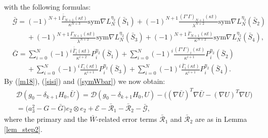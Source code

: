 \documentclass[reqno,twoside,11pt]{amsart}
\newcommand{\sym}{\mathrm{sym}}
\newcommand*{\dbar}[1]{\bar{\bar{#1}}}
\numberwithin{equation}{section}
\theoremstyle{plain}
\theoremstyle{definition}
\begin{document}
with the following formulas:
\begin{equation*}
\begin{split}
& \bar{\mathcal{G}} = (-1)^{N+1} \frac{\dbar\Gamma_{N+1}(\kappa
  t)}{\kappa^{N+3}}\sym \nabla L_N^{\eta_2}(\bar S_1)  
+ (-1)^{N+1} \frac{(\Gamma'\Gamma)_{N+1}(\kappa
  t)}{\lambda^{N+2}}\sym\nabla L_N^{\eta_2}(\bar S_2) 
\\ & \qquad + (-1)^{N+1} \frac{\Gamma_{N+1}(\kappa
  t)}{\lambda^{N+2}}\sym\nabla L_N^{\eta_2}(\bar S_3) 
+ (-1)^{N+1} \frac{\bar\Gamma_{N+1}(\kappa
  t)}{\kappa^{N+2}}\sym\nabla L_N^{\eta_2}(\bar S_4), \\
& \bar G = \sum_{i=0}^N (-1)^i \frac{\dbar\Gamma_{i}(\kappa
  t)}{\kappa^{i+2}}P_i^{\eta_2}(\bar S_1) 
+ \sum_{i=0}^N (-1)^i \frac{(\Gamma'\Gamma)_{i}(\kappa
  t)}{\kappa^{i+1}}P_i^{\eta_2}(\bar S_2) 
\\ & \qquad + \sum_{i=0}^N (-1)^i \frac{\Gamma_{i}(\kappa
  t)}{\kappa^{i+1}}P_i^{\eta_2}(\bar S_3) 
+ \sum_{i=0}^N (-1)^i \frac{\bar\Gamma_{i}(\kappa
  t)}{\kappa^{i+1}}P_i^{\eta_2}(\bar S_4). 
\end{split}
\end{equation*}
By (\ref{m18}), (\ref{sisi})  and (\ref{symWbar}) we now obtain: 
\begin{equation}\label{m12bar}
\begin{split}
& \mathcal{D}(g_0-\delta_{k+1}H_0, \bar U) = \mathcal{D}(g_0-\delta_{k+1}H_0,
U) -\big((\nabla \bar U)^T\nabla \bar U - (\nabla U)^T\nabla U\big) \\ & =
\big(a_3^2 - G-\bar G\big) e_2\otimes e_2 +\mathcal{E}
- \bar{\mathcal{R}}_1  - \bar{\mathcal{R}}_2 -\bar{\mathcal{G}},
\end{split}
\end{equation}
where the primary and the $\bar W$-related error terms
$\bar{\mathcal{R}}_1$ and $\bar{\mathcal{R}}_2$ are as in Lemma \ref{lem_step2}. 

\smallskip
\end{document}
